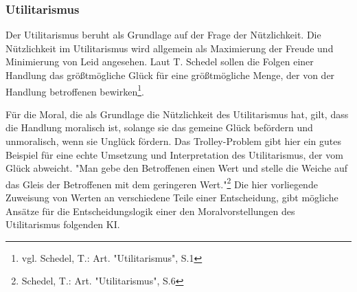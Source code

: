 \subsubsection{Utilitarismus}\label{subsubsec::utilitarismus}

Der Utilitarismus beruht als Grundlage auf der Frage der Nützlichkeit.
Die Nützlichkeit im Utilitarismus wird allgemein als Maximierung der Freude und Minimierung von Leid angesehen.
Laut T. Schedel sollen die Folgen einer Handlung das größtmögliche Glück für eine größtmögliche Menge, der von der Handlung
betroffenen bewirken\footnote{ vgl. Schedel, T.: Art. "Utilitarismus", S.1}.

Für die Moral, die als Grundlage die Nützlichkeit des Utilitarismus hat, gilt, dass die Handlung moralisch ist,
solange sie das gemeine Glück befördern und unmoralisch, wenn sie Unglück fördern.
Das Trolley-Problem gibt hier ein gutes Beispiel für eine echte Umsetzung und Interpretation des Utilitarismus, der
vom Glück abweicht.
"Man gebe den Betroffenen einen Wert und stelle die Weiche auf das Gleis der
Betroffenen mit dem geringeren Wert."\footnote{ Schedel, T.: Art. "Utilitarismus", S.6}
Die hier vorliegende Zuweisung von Werten an verschiedene Teile einer Entscheidung, gibt mögliche Ansätze für die
Entscheidungslogik einer den Moralvorstellungen des Utilitarismus folgenden KI.